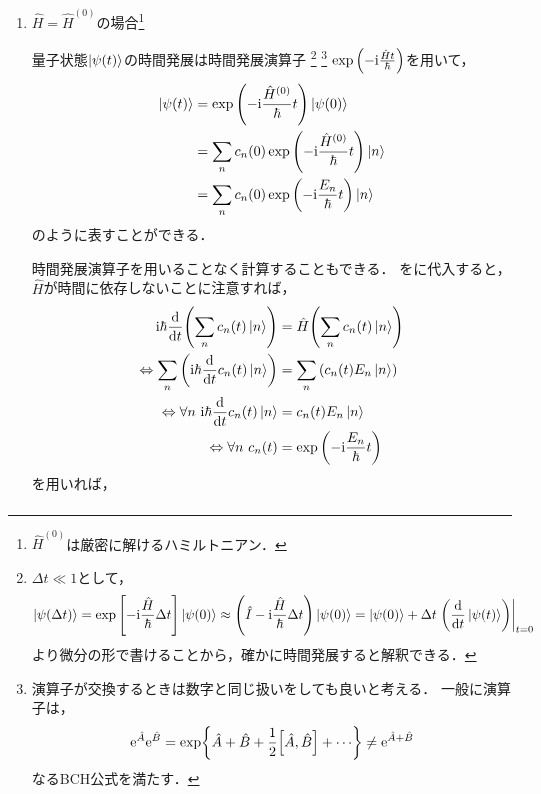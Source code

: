 \documentclass{report}
\begin{document}
  \begin{enumerate}
    \item $\hat{H} = \hat{H}^{(0)}$の場合\footnote{$\hat{H}^{(0)}$は厳密に解けるハミルトニアン．}\par
      量子状態$\ket{\psi(t)}$の時間発展は時間発展演算子
      \footnote{
        $\Delta t \ll 1$として，
        \begin{align*}
          \ket{\psi(\Delta t)} = \exp\qty[-\mathrm{i}\frac{\hat{H}}{\hbar}\Delta t]\ket{\psi(0)} \approx\qty(\hat{I} - \mathrm{i}\frac{\hat{H}}{\hbar}\Delta t)\ket{\psi(0)}
          = \ket{\psi(0)} + \Delta t \left.\qty(\dv{t}\ket{\psi(t)})\right|_{t = 0}
        \end{align*}
        より微分の形で書けることから，確かに時間発展すると解釈できる．}
      \footnote{
        演算子が交換するときは数字と同じ扱いをしても良いと考える．
        一般に演算子は，
        \begin{align*}
          \mathrm{e}^{\hat{A}}\mathrm{e}^{\hat{B}} = \exp{\hat{A} + \hat{B} + \frac{1}{2}\qty[\hat{A},\hat{B}] + \cdots}\neq\mathrm{e}^{\hat{A} + \hat{B}}
        \end{align*}
        なるBCH公式を満たす．
      }
      $\exp\qty(-\mathrm{i}\frac{\hat{H}t}{\hbar})$を用いて，
      \begin{align}
        \ket{\psi(t)} &= \exp\qty(-\mathrm{i}\frac{\hat{H}^{(0)}}{\hbar}t)\ket{\psi(0)} \\
        &= \sum_{n}c_n(0)\exp\qty(-\mathrm{i}\frac{\hat{H}^{(0)}}{\hbar}t)\ket{n} \\
        &= \sum_{n}c_n(0)\exp\qty(-\mathrm{i}\frac{E_n}{\hbar}t)\ket{n}
      \end{align}
      のように表すことができる．
      \par
      時間発展演算子を用いることなく計算することもできる．
      をに代入すると，$\hat{H}$が時間に依存しないことに注意すれば，
      \begin{align}
        \mathrm{i}\hbar\dv{t}\qty(\sum_{n}c_n(t)\ket{n}) &= \hat{H}\qty(\sum_{n}c_n(t)\ket{n}) \label{naive-solution-to-decide-ct}\\ 
        \Leftrightarrow \sum_{n}\qty(\mathrm{i}\hbar\dv{t}c_n(t)\ket{n}) &= \sum_{n}\qty(c_n(t)E_n\ket{n}) \\ 
        \Leftrightarrow \forall n\ \mathrm{i}\hbar\dv{t}c_n(t)\ket{n} &= c_n(t)E_n\ket{n} \\ 
        \Leftrightarrow \forall n\ c_n(t) &= \exp\qty(-\mathrm{i}\frac{E_n}{\hbar}t)
      \end{align}
      を用いれば，
      \begin{align}

\end{align}
\end{enumerate}
\end{document}

